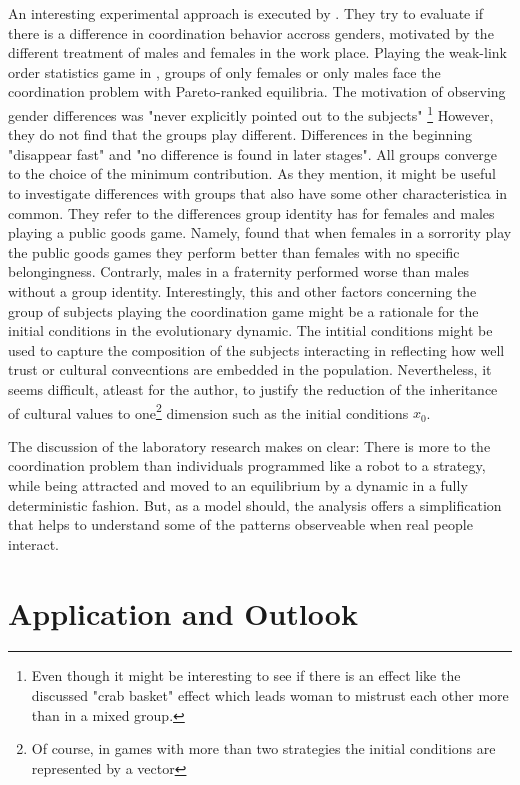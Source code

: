 \documentclass[11pt]{article}
\begin{document}
An interesting experimental approach is executed by 
\textcite{dufwenberg_gender_2005}. They try to evaluate if there is a difference
in coordination behavior accross genders, motivated by the different
treatment of males and females in the work place. Playing the weak-link order
statistics game in \cite{van_huyck_tacit_1990}, groups of only females or only
males face the coordination problem with Pareto-ranked equilibria. The 
motivation of observing gender differences was "never explicitly pointed 
out to the subjects" \parencite{dufwenberg_gender_2005}\footnote{
Even though it might be interesting to see if there is an effect like 
the discussed "crab basket" effect which leads woman to mistrust each other 
more than in a mixed group.} However, they do not find that the groups play
different. Differences in the beginning "disappear fast" and "no difference
is found in later stages". All groups converge to the choice of the minimum
contribution. As they mention, it might be useful to investigate differences
with groups that also have some other characteristica in common. They refer
to the differences group identity has for females and males playing a 
public goods game. Namely, \textcite{croson_groups_2008} found that when
females in a sorrority play the public goods games they perform better than 
females with no specific belongingness. Contrarly, males in a fraternity 
performed worse than males without a group identity. 
Interestingly, this and other factors concerning the group of subjects 
playing the coordination game might be a rationale for the initial conditions
in the evolutionary dynamic. The intitial conditions might be used to 
capture the composition of the subjects interacting in reflecting how well
trust or cultural convecntions are embedded in the population. 
Nevertheless, it seems difficult, atleast for the author, to justify
the reduction of the inheritance of cultural values to one\footnote{Of course, in games with more 
than two strategies the initial conditions are represented by a vector}
dimension such as the initial conditions $x_0$.

The discussion of the laboratory research makes on clear: There is more
to the coordination problem than individuals programmed like a robot 
to a strategy, while being attracted and moved to an equilibrium by a dynamic
in a fully deterministic fashion. But, as a model should, the analysis offers 
a simplification that helps to understand some of the patterns observeable 
when real people interact.
\section{Application and Outlook}
\end{document}
